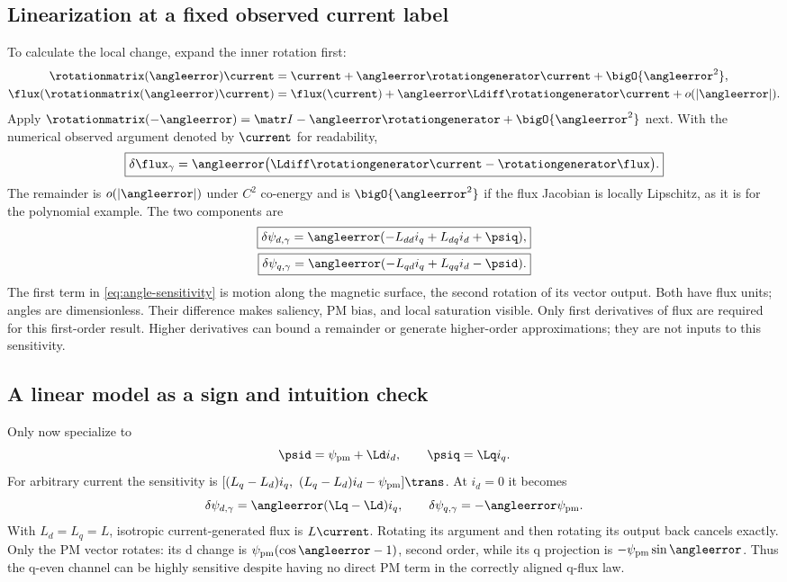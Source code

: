 \subsection{Linearization at a fixed observed current label}
To calculate the local change, expand the inner rotation first:
\begin{align}
 \rotationmatrix(\angleerror)\current&=\current+\angleerror\rotationgenerator\current+\bigO{\angleerror^2},\\
 \flux(\rotationmatrix(\angleerror)\current)&=
 \flux(\current)+\angleerror\Ldiff\rotationgenerator\current+o(|\angleerror|).
\end{align}
Apply $\rotationmatrix(-\angleerror)=\matr I-\angleerror\rotationgenerator+\bigO{\angleerror^2}$ next.
With the numerical observed argument denoted by $\current$ for readability,
\begin{equation}
 \boxed{\delta\flux_\gamma=
 \angleerror\bigl(\Ldiff\rotationgenerator\current-\rotationgenerator\flux\bigr).}
 \label{eq:angle-sensitivity}
\end{equation}
The remainder is $o(|\angleerror|)$ under $C^2$ co-energy and is
$\bigO{\angleerror^2}$ if the flux Jacobian is locally Lipschitz, as it is for
the polynomial example. The two components are
\begin{align}
 \boxed{\delta\psi_{d,\gamma}=
 \angleerror(-L_{dd}i_q+L_{dq}i_d+\psiq),}\label{eq:angle-d}\\
 \boxed{\delta\psi_{q,\gamma}=
 \angleerror(-L_{qd}i_q+L_{qq}i_d-\psid).}\label{eq:angle-q}
\end{align}
The first term in \cref{eq:angle-sensitivity} is motion along the magnetic
surface, the second rotation of its vector output. Both have flux units;
angles are dimensionless. Their difference makes saliency, PM bias, and
local saturation visible. Only first derivatives of flux are required for
this first-order result. Higher derivatives can bound a remainder or generate
higher-order approximations; they are not inputs to this sensitivity.

\subsection{A linear model as a sign and intuition check}
Only now specialize to
\begin{equation}
 \psid=\psi_{\rm pm}+\Ld i_d,\qquad\psiq=\Lq i_q.
\end{equation}
For arbitrary current the sensitivity is
$[(L_q-L_d)i_q,\ (L_q-L_d)i_d-\psi_{\rm pm}]\trans$.
At $i_d=0$ it becomes
\begin{equation}
 \delta\psi_{d,\gamma}=\angleerror(\Lq-\Ld)i_q,\qquad
 \delta\psi_{q,\gamma}=-\angleerror\psi_{\rm pm}.\label{eq:linear-check}
\end{equation}
With $L_d=L_q=L$, isotropic current-generated flux is $L\current$.
Rotating its argument and then rotating its output back cancels exactly.
Only the PM vector rotates: its d change is $\psi_{\rm pm}(\cos\angleerror-1)$,
second order, while its q projection is $-\psi_{\rm pm}\sin\angleerror$.
Thus the q-even channel can be highly sensitive despite having no direct PM
term in the correctly aligned q-flux law.

